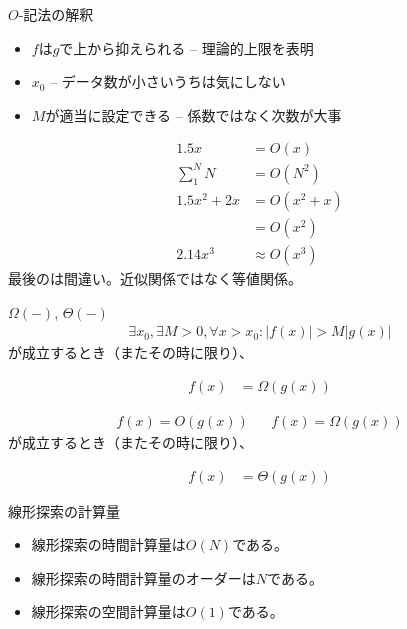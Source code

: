 \documentclass{beamer}
\begin{document}
\begin{frame}[fragile]{$O$-記法の解釈}{}

\begin{itemize}%
\item $f$は$g$で上から抑えられる -- 理論的上限を表明
\item $x_0$ -- データ数が小さいうちは気にしない
\item $M$が適当に設定できる -- 係数ではなく次数が大事
\end{itemize}

\begin{align*}
1.5 x & = O(x) \\
\sum_{1}^{N} N & = O(N^2) \\
1.5x^2 + 2x & = O(x^2 + x) \\
         & = O(x^2) \\
2.14x^3 & \approx O(x^3)
\end{align*}
最後のは間違い。近似関係ではなく等値関係。

\end{frame}

\begin{frame}[fragile]{$\Omega(-)$, $\Theta(-)$}{}
\begin{align*}
\exists x_{0}, \exists M > 0,  \forall x > x_{0} : |f(x)| > M | g(x) |
\end{align*}
が成立するとき（またその時に限り）、

\begin{align*}
f(x) &= \Omega(g(x))
\end{align*}

\vfill
\begin{align*}
f(x) = O(g(x)) && f(x) = \Omega(g(x))
\end{align*}
が成立するとき（またその時に限り）、

\begin{align*}
f(x) &= \Theta(g(x))
\end{align*}
\end{frame}

\begin{frame}[fragile]{線形探索の計算量}{}

\begin{itemize}%
\item 線形探索の時間計算量は$O(N)$である。
\item 線形探索の時間計算量のオーダーは$N$である。
\item 線形探索の空間計算量は$O(1)$である\footnotemark。
\end{itemize}


\end{frame}
\end{document}
